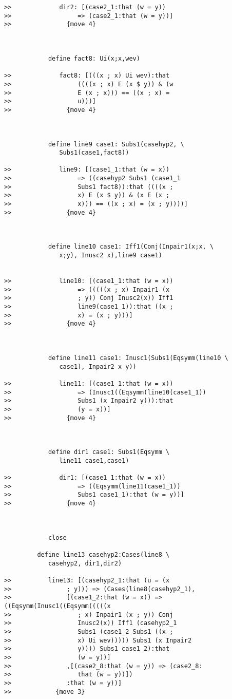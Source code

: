 \documentclass[12pt]{article}
\begin{document}
\begin{verbatim}
>>             dir2: [(case2_1:that (w = y))
>>                  => (case2_1:that (w = y))]
>>               {move 4}



            define fact8: Ui(x;x,wev)

>>             fact8: [(((x ; x) Ui wev):that
>>                  ((((x ; x) E (x $ y)) & (w
>>                  E (x ; x))) == ((x ; x) =
>>                  u)))]
>>               {move 4}



            define line9 case1: Subs1(casehyp2, \
               Subs1(case1,fact8))

>>             line9: [(case1_1:that (w = x))
>>                  => ((casehyp2 Subs1 (case1_1
>>                  Subs1 fact8)):that ((((x ;
>>                  x) E (x $ y)) & (x E (x ;
>>                  x))) == ((x ; x) = (x ; y))))]
>>               {move 4}



            define line10 case1: Iff1(Conj(Inpair1(x;x, \
               x;y), Inusc2 x),line9 case1)


>>             line10: [(case1_1:that (w = x))
>>                  => (((((x ; x) Inpair1 (x
>>                  ; y)) Conj Inusc2(x)) Iff1
>>                  line9(case1_1)):that ((x ;
>>                  x) = (x ; y)))]
>>               {move 4}



            define line11 case1: Inusc1(Subs1(Eqsymm(line10 \
               case1), Inpair2 x y))

>>             line11: [(case1_1:that (w = x))
>>                  => (Inusc1((Eqsymm(line10(case1_1))
>>                  Subs1 (x Inpair2 y))):that
>>                  (y = x))]
>>               {move 4}



            define dir1 case1: Subs1(Eqsymm \
               line11 case1,case1)

>>             dir1: [(case1_1:that (w = x))
>>                  => ((Eqsymm(line11(case1_1))
>>                  Subs1 case1_1):that (w = y))]
>>               {move 4}



            close

         define line13 casehyp2:Cases(line8 \
            casehyp2, dir1,dir2)

>>          line13: [(casehyp2_1:that (u = (x
>>               ; y))) => (Cases(line8(casehyp2_1),
>>               [(case1_2:that (w = x)) => ((Eqsymm(Inusc1((Eqsymm(((((x
>>                  ; x) Inpair1 (x ; y)) Conj
>>                  Inusc2(x)) Iff1 (casehyp2_1
>>                  Subs1 (case1_2 Subs1 ((x ;
>>                  x) Ui wev))))) Subs1 (x Inpair2
>>                  y)))) Subs1 case1_2):that
>>                  (w = y))]
>>               ,[(case2_8:that (w = y)) => (case2_8:
>>                  that (w = y))])
>>               :that (w = y))]
>>            {move 3}




\end{verbatim}
\end{document}
